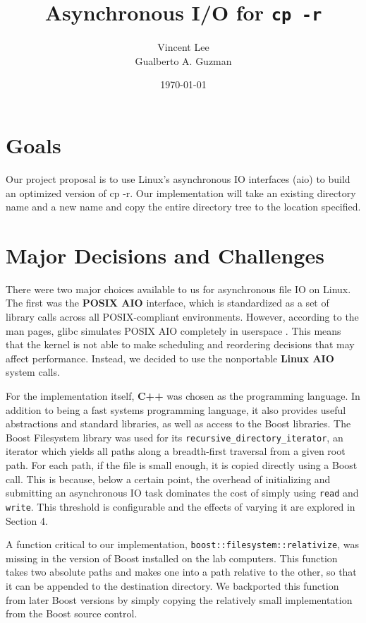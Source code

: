 \documentclass[11pt]{article}
\begin{document}
\title{Asynchronous I/O for \texttt{cp -r}}
\date{\today}
\author{Vincent Lee \\
        Gualberto A. Guzman}

\maketitle

\section{Goals}
Our project proposal is to use Linux's asynchronous IO interfaces (aio) to build an optimized
version of cp -r. Our implementation will take an existing directory name and a new name and
copy the entire directory tree to the location specified.

\section{Major Decisions and Challenges}
There were two major choices available to us for asynchronous file IO on Linux. The first was the \textbf{POSIX AIO} interface, which is standardized as a set of library calls across all POSIX-compliant environments. However, according to the man pages, glibc simulates POSIX AIO completely in userspace \cite{aio7}. This means that the kernel is not able to make scheduling and reordering decisions that may affect performance. Instead, we decided to use the nonportable \textbf{Linux AIO} system calls.

For the implementation itself, \textbf{C++} was chosen as the programming language. In addition to being a fast systems programming language, it also provides useful abstractions and standard libraries, as well as access to the Boost libraries. The Boost Filesystem library was used for its \texttt{recursive\_directory\_iterator}, an iterator which yields all paths along a breadth-first traversal from a given root path. For each path, if the file is small enough, it is copied directly using a Boost call. This is because, below a certain point, the overhead of initializing and submitting an asynchronous IO task dominates the cost of simply using \texttt{read} and \texttt{write}. This threshold is configurable and the effects of varying it are explored in Section 4.

A function critical to our implementation, \texttt{boost::filesystem::relativize}, was missing in the version of Boost installed on the lab computers. This function takes two absolute paths and makes one into a path relative to the other, so that it can be appended to the destination directory. We backported this function from later Boost versions by simply copying the relatively small implementation from the Boost source control.
\end{document}
